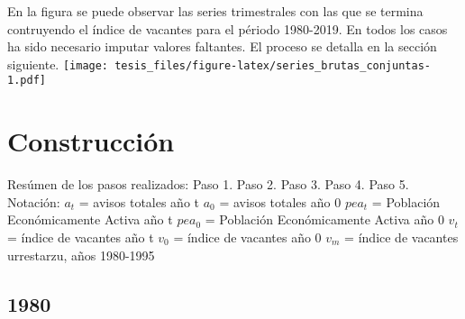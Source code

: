 \documentclass[12pt,twoside]{reedthesis}
\begin{document}
En la figura se puede observar las series trimestrales con las que se termina contruyendo el índice de vacantes para el périodo 1980-2019. En todos los casos ha sido necesario imputar valores faltantes. El proceso se detalla en la sección siguiente.
\texttt{[image: tesis\_files/figure-latex/series\_brutas\_conjuntas-1.pdf]}

\hypertarget{construcciuxf3n}{%
\section{Construcción}\label{construcciuxf3n}}

Resúmen de los pasos realizados:
Paso 1.
Paso 2.
Paso 3.
Paso 4.
Paso 5.
Notación: \newline
\(a_t\) = avisos totales año t \newline
\(a_0\) = avisos totales año 0 \newline
\(pea_t\) = Población Económicamente Activa año t \newline
\(pea_0\) = Población Económicamente Activa año 0 \newline
\(v_t\) = índice de vacantes año t \newline
\(v_0\) = índice de vacantes año 0 \newline
\(v_m\) = índice de vacantes urrestarzu, años 1980-1995 \newline

\hypertarget{section}{%
\subsection{1980}\label{section}}
\end{document}
